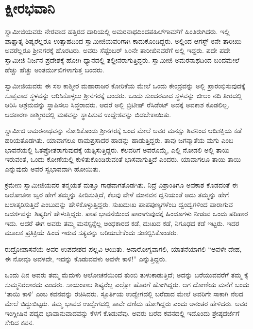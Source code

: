 
\chapter{ಕ್ಷೀರಭವಾನಿ}

 ಸ್ವಾಮೀಜಿಯವರು ನೇರವಾದ ಹತ್ತಿರದ ದಾರಿಯಲ್ಲಿ ಅಮರನಾಥದಿಂದ\break ಪಹಿಲ್‍ಗಾಮ್‍ಗೆ ಹಿಂತಿರುಗಿದರು. ಇಲ್ಲಿ ಪಾಶ್ಚಾತ್ಯ ಶಿಷ್ಯರೆಲ್ಲರೂ ಉತ್ಸಾಹದಿಂದ ಸ್ವಾಮೀಜಿಯವರಿಗಾಗಿ ಕಾದುಕೊಂಡಿದ್ದರು. ಅಲ್ಲಿಂದ ಆಗಸ್ಟ್ ೮ನೇ ತಾರೀಖು ಅವರೆಲ್ಲರೂ ಶ‍್ರೀನಗರಕ್ಕೆ ಹೊರಟರು. ಅವರು ಸೆಪ್ಟೆಂಬರ್ ೩೦ನೇ ತಾರೀಖಿನವರೆಗೆ ಅಲ್ಲಿ ಇದ್ದರು. ಪದೇ ಪದೇ ಸ್ವಾಮೀಜಿ ನಿರ್ಜನ ಪ್ರದೇಶಕ್ಕೆ ಹೋಗಿ ಧ್ಯಾನದಲ್ಲಿ ತಲ್ಲೀನರಾಗುತ್ತಿದ್ದರು. ಸ್ವಾಮೀಜಿ ಅಮರನಾಥದಿಂದ ಬಂದಮೇಲೆ ಹೆಚ್ಚು ಹೆಚ್ಚು ಅಂತರ್ಮುಖಿಗಳಾಗುತ್ತ ಬಂದರು. 

 ಸ್ವಾಮೀಜಿಯವರು ಈ ಸಲ ಕಾಶ್ಮೀರ ಮಹಾರಾಜರ ಕೋರಿಕೆಯ ಮೇಲೆ ಒಂದು ಕೇಂದ್ರವನ್ನು ಅಲ್ಲಿ ಪ್ರಾರಂಭಿಸುವುದಕ್ಕೆ ಸೂಕ್ತವಾದ ಸ್ಥಳವನ್ನು ಆರಿಸಿಕೊಳ್ಳಲು ಶ‍್ರೀನಗರಕ್ಕೆ ಬಂದರು. ಒಂದು ಸುಂದರವಾದ ಸ್ಥಳವನ್ನು ಜೀಲಂ ನದಿ ತೀರದಲ್ಲಿ ಆರಿಸಿ ಆಶ್ರಮವನ್ನು ಸ್ಥಾಪಿಸಲು ಸಿದ್ಧರಾದರು. ಆದರೆ ಅಲ್ಲಿ ಬ್ರಿಟೀಷ್ ರೆಸಿಡೆಂಟ್ ಅದಕ್ಕೆ ಅವಕಾಶ ಕೊಡಲಿಲ್ಲ. ಆದಕಾರಣ ಕಾಶ್ಮೀರದಲ್ಲಿ ಮಠವನ್ನು ಸ್ಥಾಪಿಸುವ ಉದ್ದೇಶವನ್ನು ಬಿಡಬೇಕಾಯಿತು. 

 ಸ್ವಾಮೀಜಿ ಅಮರನಾಥವನ್ನು ನೋಡಿಕೊಂಡು ಶ‍್ರೀನಗರಕ್ಕೆ ಬಂದ ಮೇಲೆ ಅವರ ಮನಸ್ಸು ಶಿವನಿಂದ ಆದಿಶಕ್ತಿಯ ಕಡೆ ಹರಿಯತೊಡಗಿತು. ಯಾವಾಗಲೂ ರಾಮಪ್ರಸಾದರ ಹಾಡನ್ನು ಹಾಡುತ್ತಿದ್ದರು. ತಾವು ಜಗನ್ಮಾತೆಯ ಮಗು ಎಂಬ ಭಾವನೆಯಲ್ಲಿ ಓತಪ್ರೋತರಾಗುವುದಕ್ಕೆ ಯತ್ನಿಸುತ್ತಿದ್ದರು. ಕೆಲವರಿಗೆ ಅವರೊಮ್ಮೆ, ಎಲ್ಲಿ ನೋಡಲಿ ಅಲ್ಲಿ ತಾಯಿ ಇರುವಂತೆ, ಒಂದು ಕೋಣೆಯಲ್ಲಿ ಕುಳಿತುಕೊಂಡಿರುವಂತೆ ಭಾಸವಾಗುತ್ತಿದೆ ಎಂದರು. ಯಾವಾಗಲೂ ತಾಯಿ ತಾಯಿ ಎನ್ನುವುದು ಅವರ ಸ್ವಭಾವವಾಗಿ ಹೋಯಿತು. 

 ಕ್ರಮೇಣ ಸ್ವಾಮೀಜಿಯವರ ತನ್ಮಯತೆ ಮತ್ತೂ ಗಾಢವಾಗತೊಡಗಿತು. ನಿದ್ರೆ ವಿಶ್ರಾಂತಿಗೂ ಅವಕಾಶ ಕೊಡದಂತೆ ಈ ಆಲೋಚನಾ ಜ್ವರ ಹೇಗೆ ತಮ್ಮನ್ನು ಪೀಡಿಸುತ್ತಿದೆ, ಕೆಲವು ವೇಳೆ ಮಾನವನ ಧ್ವನಿಯಂತೆ ಅದು ತಮ್ಮನ್ನು ಹೇಗೆ ಬಲಾತ್ಕರಿಸುತ್ತಿದೆ ಎಂಬುದನ್ನು ಹೇಳಿಕೊಳ್ಳುತ್ತಿದ್ದರು. ಸುಖದುಃಖ ಪಾಪಪುಣ್ಯಗಳೆಂಬ ದ್ವಂದ್ವಗಳಿಂದ ಪಾರಾಗುವ ಆದರ್ಶವನ್ನು ಶಿಷ್ಯರಿಗೆ ಹೇಳುತ್ತಿದ್ದರು. ಪಾಪ ಭಾವನೆಯಿಂದ ಪಾರಾಗುವುದಕ್ಕೆ ಹಿಂದೂಗಳು ನೀಡುವ ಒಂದು ಪರಿಹಾರ ಇದು. ಆದರೆ ಈಗ ಅವರು ತಮ್ಮ ಮನಸ್ಸನ್ನೆಲ್ಲ ಅಂಧಕಾರದ ಕಡೆ, ದುಃಖದ ಕಡೆ, ನಿಗೂಢದ ಕಡೆ ಇಟ್ಟರು. ಇದರ ಮೂಲಕ ಪ್ರತಿಕ್ರಿಯೆ ಹಿಂದೆ ಇರುವ ಸತ್ಯವನ್ನು ಅರಿಯಬೇಕೆಂದು ಸಂಕಲ್ಪಿಸಿಕೊಂಡರು. 

 ರುದ್ರೋಪಾಸನೆಯೆ ಅವರ ಉಪದೇಶದ ಪಲ್ಲವಿ ಆಯಿತು. ಅನಾರೋಗ್ಯವಾಗಲಿ, ಯಾತನೆಯಾಗಲಿ “ಅವಳೇ ದೇಹ, ಈ ನೋವೂ ಅವಳದೇ, ಇದನ್ನು ಕೊಡುವವಳು ಅವಳೇ ಕಾಳಿ!” ಎನ್ನುತ್ತಿದ್ದರು. 

 ಒಂದು ದಿನ ಅವರು ತಮ್ಮ ಮೆದುಳು ಆಲೋಚನೆಯಿಂದ ತುಂಬಿ ತುಳುಕಾಡುತ್ತಿದೆ; ಅದನ್ನು ಬರೆಯುವವರೆಗೆ ತಮ್ಮ ಕೈ ಸುಮ್ಮನಿರಲಾರದು ಎಂದರು. ಸಾಯಂಕಾಲ ಶಿಷ್ಯರೆಲ್ಲ ಎಲ್ಲೋ ಹೊರಗೆ ಹೋಗಿದ್ದರು. ಆಗ ದೋಣಿಯ ಮನೆಗೆ ಬಂದು ‘ತಾಯಿ ಕಾಳಿ’ ಎಂಬ ಕವನವನ್ನು ರಚಿಸಿದರು. ಸ್ಫೂರ್ತಿಯ ಉದ್ವೇಗದಲ್ಲಿ ಬರೆದಾದ ಮೇಲೆ ಅವರಿಗೇ ಸಾಕಾಗಿ ನೆಲದ ಮೇಲೆ ಬಿದ್ದುಬಿಟ್ಟರು. ತಮ್ಮ ಭಾವದ ಉದ್ವೇಗದಲ್ಲಿ ತಾವೇ ದಣಿದು ಹೋಗಿದ್ದರು ಎಂದು ಅನಂತರ ಹೇಳಿದರು. ಅವರ ಇಂಗ್ಲೀಷಿನ ಪದ್ಯದ ಭಾವಾನುವಾದವನ್ನು ಕೆಳಗೆ ಕೊಡುವೆವು. ಅವರು ಬರೆದ ಕವನದಲ್ಲಿ ಇದೊಂದು ಶ್ರೇಷ್ಠದರ್ಜೆಗೆ ಸೇರಿದ ಕವನ.

